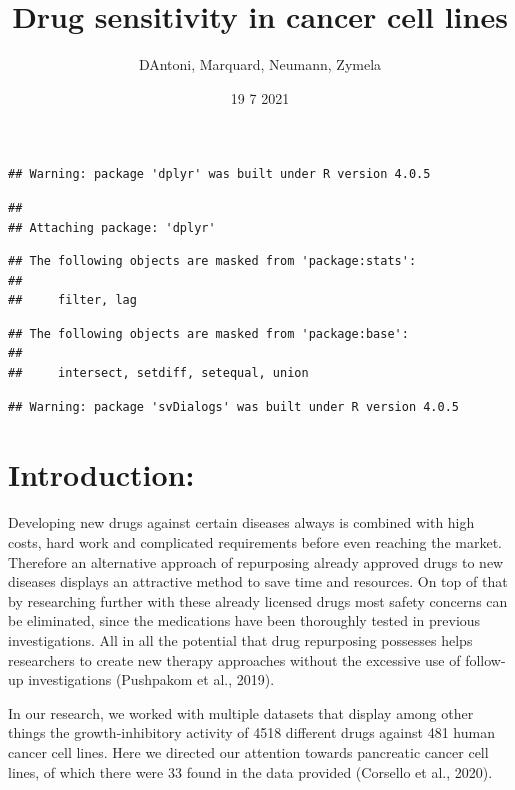 \documentclass[
]{article}
\title{Drug sensitivity in cancer cell lines}
\author{DAntoni, Marquard, Neumann, Zymela}
\date{19 7 2021}
\begin{document}
\maketitle

\begin{verbatim}
## Warning: package 'dplyr' was built under R version 4.0.5
\end{verbatim}

\begin{verbatim}
## 
## Attaching package: 'dplyr'
\end{verbatim}

\begin{verbatim}
## The following objects are masked from 'package:stats':
## 
##     filter, lag
\end{verbatim}

\begin{verbatim}
## The following objects are masked from 'package:base':
## 
##     intersect, setdiff, setequal, union
\end{verbatim}

\begin{verbatim}
## Warning: package 'svDialogs' was built under R version 4.0.5
\end{verbatim}

\hypertarget{introduction}{%
\section{Introduction:}\label{introduction}}

Developing new drugs against certain diseases always is combined with
high costs, hard work and complicated requirements before even reaching
the market. Therefore an alternative approach of repurposing already
approved drugs to new diseases displays an attractive method to save
time and resources. On top of that by researching further with these
already licensed drugs most safety concerns can be eliminated, since the
medications have been thoroughly tested in previous investigations. All
in all the potential that drug repurposing possesses helps researchers
to create new therapy approaches without the excessive use of follow-up
investigations (Pushpakom et al., 2019).

In our research, we worked with multiple datasets that display among
other things the growth-inhibitory activity of 4518 different drugs
against 481 human cancer cell lines. Here we directed our attention
towards pancreatic cancer cell lines, of which there were 33 found in
the data provided (Corsello et al., 2020).
\end{document}
